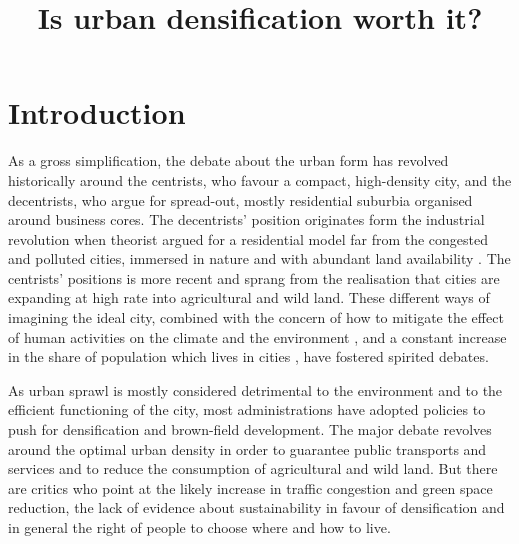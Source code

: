 \documentclass [a4paper,12pt]{article} %
\begin{document}
\title{Is urban densification worth it?}
\maketitle

\section*{Introduction} 

As a gross simplification, the debate about the urban form has revolved historically around the centrists, who favour a compact, high-density city, and the decentrists, who argue for spread-out, mostly residential suburbia organised around business cores. The decentrists' position originates form the industrial revolution when theorist argued for a residential model far from the congested and polluted cities, immersed in nature and with abundant land availability \citep{horward1898garden}. The centrists' positions is more recent and sprang from the realisation that cities are expanding at high rate into agricultural and wild land. These different ways of imagining the ideal city, combined with the concern of how to mitigate the effect of human activities on the climate and the environment \citep{COP21}, and a constant increase in the share of population which lives in cities \citep{united2014world}, have fostered spirited debates.

As urban sprawl is mostly considered detrimental to the environment and to the efficient functioning of the city, most administrations have adopted policies to push for densification and brown-field development. The major debate revolves around the optimal urban density in order to guarantee public transports and services and to reduce the consumption of agricultural and wild land. But there are critics who point at the likely increase in traffic congestion and green space reduction, the lack of evidence about sustainability in favour of densification and in general the right of people to choose where and how to live.
\end{document}
